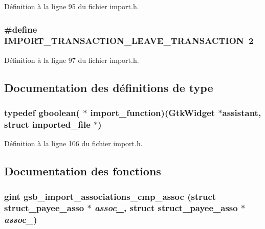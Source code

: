 Définition à la ligne 95 du fichier import.h.

\subsubsection[{IMPORT\_\-TRANSACTION\_\-LEAVE\_\-TRANSACTION}]{\setlength{\rightskip}{0pt plus 5cm}\#define IMPORT\_\-TRANSACTION\_\-LEAVE\_\-TRANSACTION~2}\label{import_8h_a835ae119c50247e8cf93d47580689a5a}


Définition à la ligne 97 du fichier import.h.



\subsection{Documentation des définitions de type}
\subsubsection[{import\_\-function}]{\setlength{\rightskip}{0pt plus 5cm}typedef gboolean( $\ast$  {\bf import\_\-function})(GtkWidget $\ast$assistant, struct {\bf imported\_\-file} $\ast$)}\label{import_8h_ae5eefe8d2e5aee94dc314801a7faaf15}


Définition à la ligne 106 du fichier import.h.



\subsection{Documentation des fonctions}
\subsubsection[{gsb\_\-import\_\-associations\_\-cmp\_\-assoc}]{\setlength{\rightskip}{0pt plus 5cm}gint gsb\_\-import\_\-associations\_\-cmp\_\-assoc (struct {\bf struct\_\-payee\_\-asso} $\ast$ {\em assoc\_}, \/  struct {\bf struct\_\-payee\_\-asso} $\ast$ {\em assoc\_})}\label{import_8h_a973a66dc9a88ed606bd0936f32919a4f}


